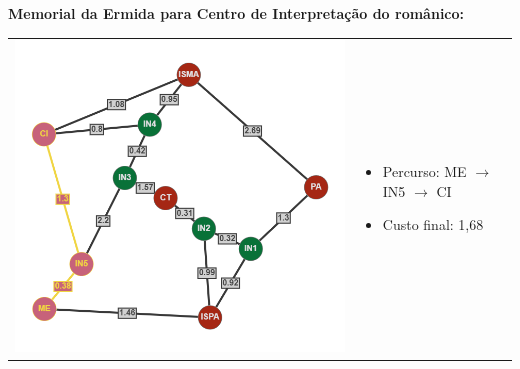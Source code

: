 \documentclass[12pt]{article}
\begin{document}
    \noindent \textbf{Memorial da Ermida para Centro de Interpretação do românico:}\\
    \begin{tabular}{@{}m{}m{}@{}}
      \centering\includegraphics[scale=0.4]{anexos/ME-CI.png} &
      \begin{itemize}
        \item Percurso: ME $\rightarrow$ IN5 $\rightarrow$ CI
        \item Custo final: 1,68
      \end{itemize}
    \end{tabular} 
    
    \newpage
    
\end{document}
